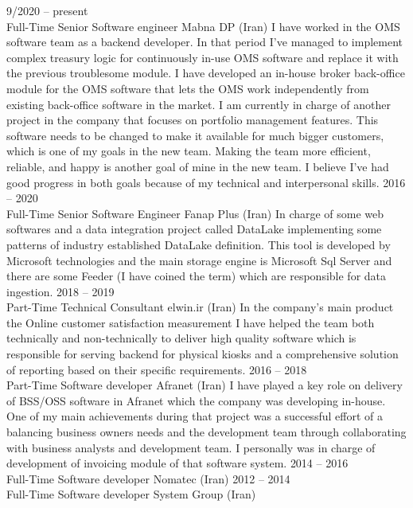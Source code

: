 \documentclass[9pt]{developercv} %
\begin{document}


\begin{entrylist}
	\entry
		{9/2020 -- present\\\footnotesize{Full-Time}}
		{Senior Software engineer}
		{Mabna DP (Iran)}
		{I have worked in the OMS software team as a backend developer. In that period I've managed to implement complex treasury logic for continuously in-use OMS software and replace it with the previous troublesome module. I have developed an in-house broker back-office module for the OMS software that lets the OMS work independently from existing back-office software in the market. I am currently in charge of another project in the company that focuses on portfolio management features. This software needs to be changed to make it available for much bigger customers, which is one of my goals in the new team. Making the team more efficient, reliable, and happy is another goal of mine in the new team. I believe I've had good progress in both goals because of my technical and interpersonal skills.}
	\entry
		{2016 -- 2020\\\footnotesize{Full-Time}}
		{Senior Software Engineer}
		{Fanap Plus (Iran)}
		{In charge of some web softwares and a data integration project called DataLake implementing some patterns of industry
established DataLake definition. This tool is developed by Microsoft technologies
and the main storage engine is Microsoft Sql Server and there are some Feeder (I have coined the term) which are responsible for data ingestion.}
	\entry
		{2018 -- 2019\\\footnotesize{Part-Time}}
		{Technical Consultant}
		{elwin.ir (Iran)}
		{In the company’s main product the
Online customer satisfaction measurement I have helped the team both technically and non-technically to deliver high quality software which is
responsible for
serving backend for physical kiosks and a comprehensive solution of reporting based on their specific
requirements.}
	\entry
		{2016 -- 2018\\\footnotesize{Part-Time}}
		{Software developer}
		{Afranet (Iran)}
		{I have played a key role on delivery of BSS/OSS software in Afranet
which the company was developing in-house. One of my main achievements during
that project was a successful effort of a balancing business owners needs and the
development team through collaborating with business analysts and development
team. I personally was in charge of development of invoicing module of that
software system.}
\entry
		{2014 -- 2016\\\footnotesize{Full-Time}}
		{Software developer}
		{Nomatec (Iran)}
		{}
	\entry
		{2012 -- 2014\\\footnotesize{Full-Time}}
		{Software developer}
		{System Group (Iran)}
		{}
\end{entrylist}
\end{document}

